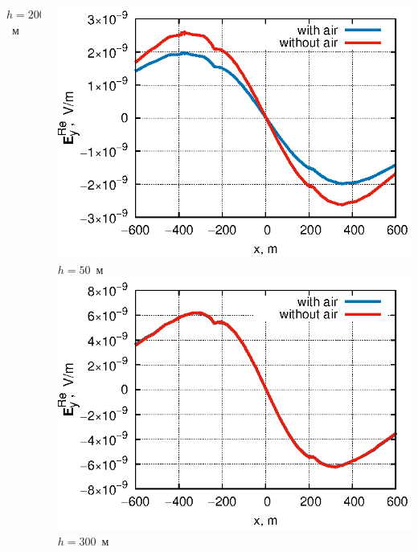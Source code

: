 \documentclass[aspectratio=43]{beamer}
\begin{document}
\begin{frame}
\begin{columns}[t,totalwidth=\linewidth]
\begin{column}{.5\linewidth}
\begin{center}
			\tiny{$h=200$~м} \\
			\end{center}
		\end{column}
		\begin{column}{.5\linewidth}
			\vspace{-1.7em}
			\begin{center}
			\includegraphics[width=\textwidth,height=0.4\textheight,keepaspectratio]{deep_-50.eps} \\
			\vspace{-0.1em}
			\tiny{$h=50$~м} \\
			\includegraphics[width=\textwidth,height=0.4\textheight,keepaspectratio]{deep_-300.eps} \\
			\vspace{-0.1em}
			\tiny{$h=300$~м} \\
			\end{center}
		\end{column}
	\end{columns}
\end{frame}
\end{document}
